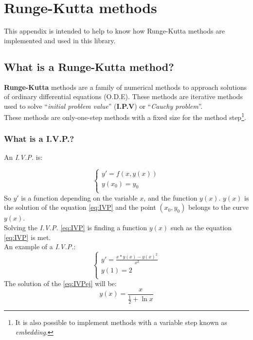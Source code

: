 %
%

\chapter{Runge-Kutta methods} \label{ch:runge}

This appendix is intended to help to know how Runge-Kutta methods are implemented and used in this library.

\section{What is a Runge-Kutta method?}

\textbf{Runge-Kutta} methods are a family of numerical methods to approach solutions of ordinary differential equations (O.D.E). These methods are iterative methods used to solve ``\emph{initial problem value}'' (\textbf{I.P.V}) or ``\emph{Cauchy problem}''.\\

These methods are only-one-step methods with a fixed size for the method step\footnote{It is also possible to implement methods with a variable step known as \emph{embedding}.}.\\

\subsection{What is a I.V.P.?}

An \emph{I.V.P.} is:

\begin{equation} \label{eq:IVP}
\left\{ \begin{array}{l}
y' = f(x, y(x))\\
y(x_0) = y_0\\
\end{array} \right.
\end{equation}
%
So $y'$ is a function depending on the variable $x$, and the function $y(x)$. $y(x)$ is the solution of the equation \ref{eq:IVP} and the point $(x_0,y_0)$ belongs to the curve $y(x)$.\\

Solving the \emph{I.V.P.} \ref{eq:IVP} is finding a function $y(x)$ such as the equation \ref{eq:IVP} is met.\\

An example of a \emph{I.V.P.}:
%
\begin{equation} \label{eq:IVPej}
\left\{ \begin{array}{l}
y' = \frac{x * y(x) - y(x)^2}{x^2} \\
y(1) = 2 \\
\end{array} \right.
\end{equation}
%
The solution of the \ref{eq:IVPej} will be:
%
\begin{equation}
y(x) = \frac{x}{\frac{1}{2}+\ln x}
\end{equation}

